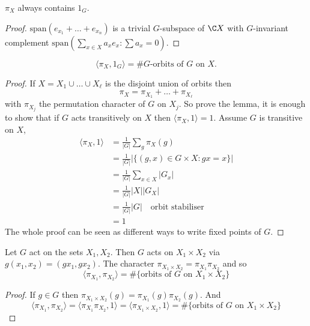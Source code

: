 \documentclass[a4paper]{article}
\theoremstyle{definition}
\begin{document}
\begin{lemma}
  \(\pi_X\) always contains \(1_G\).
\end{lemma}

\begin{proof}
  \(\text{span}(e_{x_1} + \dots + e_{x_n})\) is a trivial \(G\)-subspace of \(\C X\) with \(G\)-invariant complement \(\text{span}(\sum_{x \in X} a_x e_x: \sum a_x = 0)\).
\end{proof}

\begin{lemma}
  \[
    \langle \pi_X, 1_G \rangle = \# G\text{-orbits of \(G\) on \(X\)}.
  \]
\end{lemma}

\begin{proof}
  If \(X = X_1 \cup \dots \cup X_\ell\) is the disjoint union of orbits then
  \[
    \pi_X = \pi_{X_1} + \dots + \pi_{X_\ell}
  \]
  with \(\pi_{X_j}\) the permutation character of \(G\) on \(X_j\). So prove the lemma, it is enough to show that if \(G\) acts transitively on \(X\) then \(\langle \pi_X, 1 \rangle = 1\). Assume \(G\) is transitive on \(X\),
  \begin{align*}
    \langle \pi_X, 1 \rangle
    &= \frac{1}{|G|} \sum_g \pi_X(g) \\
    &= \frac{1}{|G|} |\{(g, x) \in G \times X: gx = x\}| \\
    &= \frac{1}{|G|} \sum_{x \in X} |G_x| \\
    &= \frac{1}{|G|} |X| |G_X| \\
    &= \frac{1}{|G|} |G| \quad \text{orbit stabiliser} \\
    &= 1
  \end{align*}
  The whole proof can be seen as different ways to write fixed points of \(G\).
\end{proof}

\begin{lemma}
  Let \(G\) act on the sets \(X_1, X_2\). Then \(G\) acts on \(X_1 \times X_2\) via \(g(x_1, x_2) = (gx_1, gx_2)\). The character \(\pi_{X_1 \times X_2} = \pi_{X_1} \pi_{X_2}\) and so
  \[
    \langle \pi_{X_1}, \pi_{X_2} \rangle
    = \#\{\text{orbits of \(G\) on \(X_1 \times X_2\)}\}
  \]
\end{lemma}

\begin{proof}
  If \(g \in G\) then \(\pi_{X_1 \times X_2}(g) = \pi_{X_1}(g) \pi_{X_2}(g)\). And
  \[
    \langle \pi_{X_1}, \pi_{X_2} \rangle
    = \langle \pi_{X_1} \pi_{X_2}, 1 \rangle
    = \langle \pi_{X_1 \times X_2}, 1 \rangle
    = \#\{\text{orbits of \(G\) on \(X_1 \times X_2\)}\}
  \]
\end{proof}
\end{document}
